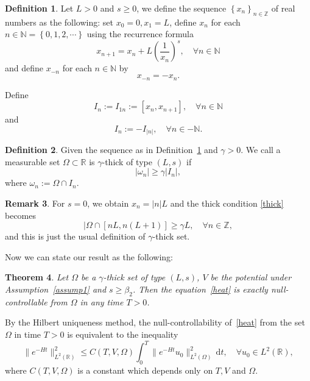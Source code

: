 \documentclass{amsart}
\renewcommand{\d}{\,\mathrm{d}}
\newcommand\N{\ensuremath{\mathbb{N}}}
\newcommand\R{\ensuremath{\mathbb{R}}}
\newcommand\Z{\ensuremath{\mathbb{Z}}}
\newtheorem{theorem}{Theorem}[section]
\theoremstyle{definition}
\newtheorem{remark}[theorem]{Remark}
\newtheorem{definition}[theorem]{Definition}
\begin{document}
\begin{definition}\label{def:1}
	Let  $L>0$ and $s\ge 0$, we define the sequence $\left\{x_n\right\}_{n\in \Z}$ of real numbers as the following: set $x_0=0,x_1=L$, define $x_{n}$ for each $n\in \N=\left\{0,1,2,\cdots\right\} $ using the recurrence formula
	\begin{equation}
		x_{n+1}=x_n+L\left( \frac{1}{x_n} \right) ^{s}, \quad \forall n \in \N
	\end{equation}
	and define $x_{-n}$ for each $n \in \N$ by
	\begin{equation}
		x_{-n}=-x_{n}.
	\end{equation}
\end{definition}

Define
\begin{equation}
	I_{n}:=I_{1n}:=\left[ x_n,x_{n+1} \right] ,\quad \forall n\in \N
\end{equation}
and
\begin{equation}
	I_{n}:=-I_{|n|},\quad \forall  n\in -\N.
\end{equation}

\begin{definition}
	Given the sequence as in Definition~\ref{def:1} and $\gamma>0$. We call a measurable set $\Omega\subset \R$ is $\gamma$-thick of type $(L,s)$ if
	\begin{equation}
		|\omega_n|\ge \gamma |I_n|,\label{thick} 
	\end{equation}
	where $\omega_n:=\Omega\cap I_n$.
\end{definition}

\begin{remark}
	For $s=0$, we obtain $x_{n}=|n|L$ and the thick condition \eqref{thick} becomes
	\begin{equation}
		|\Omega \cap [nL,n(L+1)]\ge \gamma L, \quad \forall n\in \Z,
	\end{equation}
	and this is just the usual definition of $\gamma$-thick set.	
\end{remark}
Now we can state our result as the following:
\begin{theorem}\label{main}
	Let $\Omega$ be a $\gamma$-thick set of type $(L,s)$, $V$ be the potential under Assumption~\ref{assump1} and  $s\ge \beta_2$. Then the equation~\eqref{heat} is exactly null-controllable from $\Omega$ in any time $T>0$. 
\end{theorem}
By the Hilbert uniqueness method, the null-controllability of~\eqref{heat} from the set $\Omega$ in time $T>0$ is equivalent to the inequality
\begin{equation}
	\|e^{-Ht}\|^2_{L^2(\R)}\le C(T,V,\Omega) \int_0^{T}\|e^{-Ht}u_0\|^2_{L^2(\Omega)}\d t, \quad \forall u_0 \in L^2(\R),\label{obs} 
\end{equation}
where $C(T,V,\Omega)$ is a constant which depends only on $T,V$ and $\Omega$.
\end{document}
